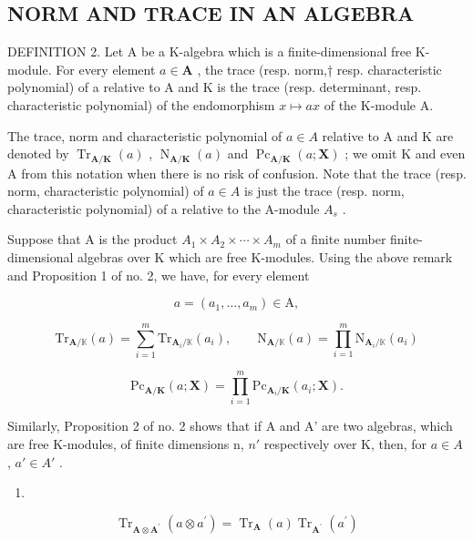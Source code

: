 \subsection{NORM AND TRACE IN AN ALGEBRA}

DEFINITION 2. Let A be a K-algebra which is a finite-dimensional free K-module. For every element \(a \in \mathbf{A}\) , the trace (resp. norm,† resp. characteristic polynomial) of a relative to A and K is the trace (resp. determinant, resp. characteristic polynomial) of the endomorphism \(x \mapsto ax\) of the K-module A.

The trace, norm and characteristic polynomial of \(a \in A\) relative to A and K are denoted by \(\operatorname{Tr}_{\mathbf{A}/\mathbf{K}}(a)\) , \(\operatorname{N}_{\mathbf{A}/\mathbf{K}}(a)\) and \(\operatorname{Pc}_{\mathbf{A}/\mathbf{K}}(a; \mathbf{X})\) ; we omit K and even A from this notation when there is no risk of confusion. Note that the trace (resp. norm, characteristic polynomial) of \(a \in A\) is just the trace (resp. norm, characteristic polynomial) of a relative to the A-module \(A_{s}\) .

Suppose that A is the product \(A_{1} \times A_{2} \times \cdots \times A_{m}\) of a finite number finite-dimensional algebras over K which are free K-modules. Using the above remark and Proposition 1 of no. 2, we have, for every element

\[
a = (a _ {1}, \dots , a _ {m}) \in \mathrm{A},
\]

\[
\mathrm{Tr} _ {\mathbf {A} / \mathbb {K}} (a) = \sum_ {i = 1} ^ {m} \mathrm{Tr} _ {\mathbf {A} _ {i} / \mathbb {K}} (a _ {i}), \qquad \mathrm{N} _ {\mathbf {A} / \mathbb {K}} (a) = \prod_ {i = 1} ^ {m} \mathrm{N} _ {\mathbf {A} _ {i} / \mathbb {K}} (a _ {i})\tag{18}
\]

\[
\mathrm{Pc} _ {\mathbf {A} / \mathbf {K}} (a; \mathbf {X}) = \prod_ {i = 1} ^ {m} \mathrm{Pc} _ {\mathbf {A} _ {i} / \mathbf {K}} (a _ {i}; \mathbf {X}).
\]

Similarly, Proposition 2 of no. 2 shows that if A and A' are two algebras, which are free K-modules, of finite dimensions n, \(n'\) respectively over K, then, for \(a \in A\) , \(a' \in A'\) .

\begin{enumerate}
\def\labelenumi{(\arabic{enumi})}
\setcounter{enumi}{18}
\tightlist
\item
\end{enumerate}

\[
\operatorname{Tr} _ {\mathbf {A} \otimes \mathbf {A} ^ {\prime}} (a \otimes a ^ {\prime}) = \operatorname{Tr} _ {\mathbf {A}} (a) \operatorname{Tr} _ {\mathbf {A} ^ {\prime}} (a ^ {\prime})\tag{20}
\]

